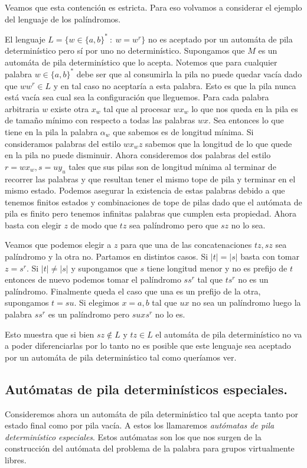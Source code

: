 \documentclass[tesis.tex]{subfiles}
\newcommand{\APD}{automáta de pila determinístico }
\begin{document}
Veamos que esta contención es estricta. Para eso volvamos a considerar el ejemplo del lenguaje de los palíndromos.
\begin{ej}
	El lenguaje $L = \{ w \in \{ a,b \}^*  \ : \ w = w^r \}$ no es aceptado por un \APD pero sí por uno no determinístico. 
	Supongamos que $M$ es un \APD que lo acepta. 
	Notemos que para cualquier palabra $w \in \{ a,b \}^*$ debe ser que al consumirla la pila no puede quedar vacía dado que $ww^r \in L$ y en tal caso no aceptaría a esta palabra. 
	Esto es que la pila nunca está vacía sea cual sea la configuración que lleguemos. 
	Para cada palabra arbitraria $w$ existe otra $x_w$ tal que al procesar $wx_w$ lo que nos queda en la pila es de tamaño mínimo con respecto a todas las palabras $wx$. 
	Sea entonces lo que tiene en la pila la palabra $\alpha_w$ que sabemos es de longitud mínima. Si consideramos palabras del estilo $wx_wz$ sabemos que la longitud de lo que quede en la pila no puede disminuir. 
	Ahora consideremos dos palabras del estilo $r=wx_w, s=uy_u$ tales que sus pilas son de longitud mínima al terminar de recorrer las palabras y que resultan tener el mismo tope de pila y terminar en el mismo estado. 
	Podemos asegurar la existencia de estas palabras debido a que tenemos finitos estados y combinaciones de tope de pilas dado que el autómata de pila es finito pero tenemos infinitas palabras que cumplen esta propiedad. 
	Ahora basta con elegir $z$ de modo que $tz$ sea palíndromo pero que $sz$ no lo sea. 
	
	Veamos que podemos elegir a $z$ para que una de las concatenaciones $tz,sz$ sea palíndromo y la otra no. Partamos en distintos casos. 
	Si $|t|=|s|$ basta con tomar $z=s^r$. 
	Si $|t|\neq |s|$ y supongamos que $s$ tiene longitud menor y no es prefijo de $t$ entonces de nuevo podemos tomar el palíndromo $ss^r$ tal que $ts^r$ no es un palíndromo. 
	Finalmente queda el caso que una es un prefijo de la otra, supongamos $t=su$. 
	Si elegimos $x=a,b$ tal que $ux$ no sea un palíndromo luego la palabra $ss^r$ es un palíndromo pero $suxs^r$ no lo es.
	
	Esto muestra que si bien $sz \notin L$ y $tz \in L$ el \APD no va a poder diferenciarlas por lo tanto no es posible que este lenguaje sea aceptado por un \APD tal como queríamos ver.
	
\end{ej}

\subsection{Autómatas de pila determinísticos especiales.} 
Consideremos ahora un \APD tal que acepta tanto por estado final como por pila vacía. A estos los llamaremos \textit{autómatas de pila determinístico especiales}.  
Estos autómatas son los que nos surgen de la construcción del autómata del problema de la palabra  para grupos virtualmente libres. 
\end{document}
